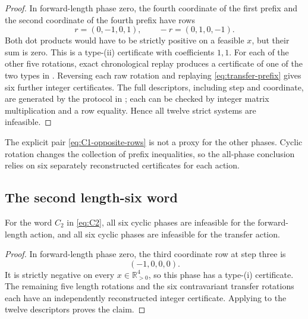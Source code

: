 \begin{proof}
In forward-length phase zero, the fourth coordinate of the first prefix and
the second coordinate of the fourth prefix have rows
\begin{equation}
 r=(0,-1,0,1),\qquad -r=(0,1,0,-1).
 \label{eq:C1-opposite-rows}
\end{equation}
Both dot products would have to be strictly positive on a feasible $x$, but
their sum is zero.  This is a type-(ii) certificate with coefficients $1,1$.
For each of the other five rotations, exact chronological replay produces a
certificate of one of the two types in .
Reversing each raw rotation and replaying \eqref{eq:transfer-prefix} gives six
further integer certificates.  The full descriptors, including step and
coordinate, are generated by the protocol in ; each
can be checked by integer matrix multiplication and a row equality.  Hence
all twelve strict systems are infeasible.
\end{proof}

The explicit pair \eqref{eq:C1-opposite-rows} is not a proxy for the other
phases.  Cyclic rotation changes the collection of prefix inequalities, so
the all-phase conclusion relies on six separately reconstructed certificates
for each action.

\subsection{The second length-six word}

\begin{theorem}
\label{thm:C2-all-phases}
For the word $C_2$ in \eqref{eq:C2}, all six cyclic phases are infeasible for
the forward-length action, and all six cyclic phases are infeasible for the
transfer action.
\end{theorem}

\begin{proof}
In forward-length phase zero, the third coordinate row at step three is
\begin{equation}
 (-1,0,0,0).
 \label{eq:C2-negative-row}
\end{equation}
It is strictly negative on every $x\in\mathbb R_{>0}^4$, so this phase has a
type-(i) certificate.  The remaining five length rotations and the six
contravariant transfer rotations each have an independently reconstructed
integer certificate.  Applying  to the twelve
descriptors proves the claim.
\end{proof}

